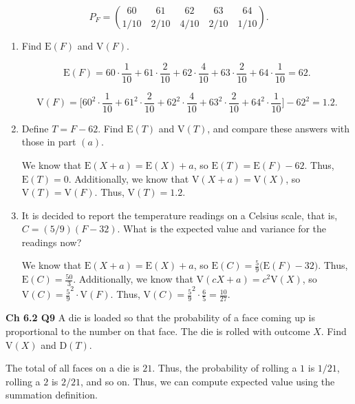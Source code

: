 \documentclass[12pt]{article}
\newcommand{\nspace}{\vspace*{.5cm}}
\newcommand{\nline}{\nspace \noindent}
\newcommand{\expected}[1]{\text{E}(#1)}
\begin{document}
\begin{equation*}
P_F = { 60 \qquad 61 \qquad 62 \qquad  63 \qquad 64 \choose 1/10 \quad 2/10 \quad 4/10 \quad 2/10 \quad 1/10}.
\end{equation*}

\begin{enumerate}[label=(\alph*)]
\item Find $\expected{F}$ and $\text{V}(F)$.

\begin{equation*}
\expected{F} = 60 \cdot \frac{1}{10} + 61 \cdot \frac{2}{10} + 62 \cdot \frac{4}{10} + 63 \cdot \frac{2}{10} + 64 \cdot \frac{1}{10} = 62.
\end{equation*}

\begin{equation*}
\text{V}(F) = \Big [ 60^2 \cdot \frac{1}{10} + 61^2 \cdot \frac{2}{10} + 62^2 \cdot \frac{4}{10} + 63^2 \cdot \frac{2}{10} + 64^2 \cdot \frac{1}{10} \Big ] - 62^2 = 1.2.
\end{equation*}

\item Define $T = F - 62$. Find $\expected{T}$ and $\text{V}(T)$, and compare these answers with those in part $(a)$.

\nline
We know that $\expected{X + a} = \expected{X} + a$, so $\expected{T} = \expected{F} - 62$. Thus, $\expected{T} = 0$. Additionally, we know that $\text{V}(X + a) = \text{V}(X)$, so $\text{V}(T) = \text{V}(F)$. Thus, $\text{V}(T) = 1.2$.


\item It is decided to report the temperature readings on a Celsius scale, that
is, $C = (5/9) (F - 32)$. What is the expected value and variance for the
readings now? 

\nline
We know that $\expected{X + a} = \expected{X} + a$, so $\expected{C} = \frac{5}{9} \Big ( \expected{F} - 32 \Big )$. Thus, $\expected{C} = \frac{50}{3}$. Additionally, we know that $\text{V}(cX + a) = c^2 \text{V}(X)$, so $\text{V}(C) = \frac{5}{9}^2 \cdot \text{V}(F)$. Thus, $\text{V}(C) = \frac{5}{9}^2 \cdot \frac{6}{5}= \frac{10}{27}$.
\end{enumerate}

\nline
\textbf{Ch 6.2 Q9} A die is loaded so that the probability of a face coming up is proportional to the number on that face. The die is rolled with outcome $X$. Find $\text{V}(X)$ and $\text{D}(T)$.

\nline
The total of all faces on a die is $21$. Thus, the probability of rolling a $1$ is $1/21$, rolling a $2$ is $2/21$, and so on. Thus, we can compute expected value using the summation definition.
\end{document}
